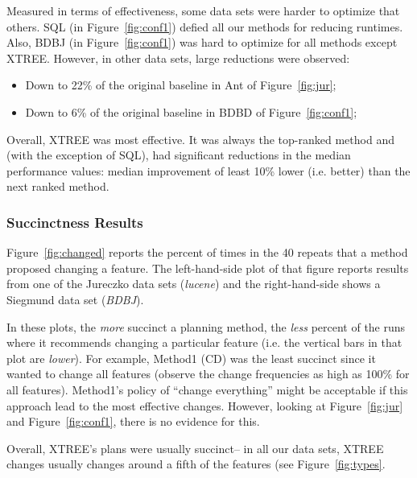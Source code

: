 \documentclass{sig-alternate}
\newcommand{\bi}{\begin{itemize}}
\newcommand{\ei}{\end{itemize}}
\newcommand{\fig}[1]{Figure~\ref{fig:#1}}
\begin{document}
 

Measured in terms of effectiveness,
some data sets were harder to optimize that others.  SQL (in \fig{conf1}) defied all 
our methods for reducing runtimes. Also, BDBJ (in \fig{conf1}) was hard to optimize
for all methods except XTREE.  However, in other data sets,
large reductions were observed:
\bi
\item
Down to 22\% of the original baseline in Ant of \fig{jur};
\item
Down to 6\% of the original baseline in BDBD  of \fig{conf1};
\ei
Overall, XTREE was most effective. It was always  the top-ranked method and (with 
the exception of SQL), had significant reductions in the median performance
values: median improvement of least 10\% lower (i.e. better) than the next ranked method.



\subsubsection{Succinctness Results}



\fig{changed} reports the percent of times in the 40 repeats that a method proposed changing a feature.
The left-hand-side plot of that figure reports results from one of the  Jureczko data sets ({\em lucene}) and the right-hand-side
  shows a Siegmund data set ({\em BDBJ}). 
  
  In these plots, the {\em more} succinct a planning method, the {\em less} percent
  of the runs
  where 
  it   recommends changing a particular feature (i.e. the vertical bars in that plot
  are {\em lower}). For example,
 Method1 (CD) was the least succinct  since it  wanted to change all features 
 (observe the change frequencies as 
high as 100\% for all features). 
Method1's policy of ``change everything''  might be acceptable
if this approach lead 
to the most effective changes. However, looking at 
\fig{jur} and  \fig{conf1}, there is no evidence for this.  

Overall,  XTREE's plans were usually succinct--  in all our data sets,
 XTREE changes 
 usually changes around a fifth of the features (see \fig{types}.
\end{document}
